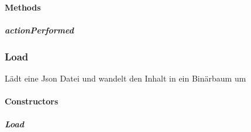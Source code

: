 \documentclass[letterpaper,10pt,ngerman]{sphinxmanual}
\begin{document}
\paragraph{Methods}
\label{\detokenize{com/linuxluigi/edu/Controller-NodeListener:methods}}

\subparagraph{actionPerformed}
\label{\detokenize{com/linuxluigi/edu/Controller-NodeListener:actionperformed}}

\begin{fulllineitems}
\label{\detokenize{com/linuxluigi/edu/Controller-NodeListener:com.linuxluigi.edu.Controller.NodeListener.actionPerformed(ActionEvent)}}
\end{fulllineitems}



\subsubsection{Load}
\label{\detokenize{com/linuxluigi/edu/Load::doc}}\label{\detokenize{com/linuxluigi/edu/Load:load}}

\begin{fulllineitems}
\label{\detokenize{com/linuxluigi/edu/Load:com.linuxluigi.edu.Load}}
Lädt eine Json Datei und wandelt den Inhalt in ein Binärbaum um

\end{fulllineitems}



\paragraph{Constructors}
\label{\detokenize{com/linuxluigi/edu/Load:constructors}}

\subparagraph{Load}
\label{\detokenize{com/linuxluigi/edu/Load:id1}}
\end{document}
